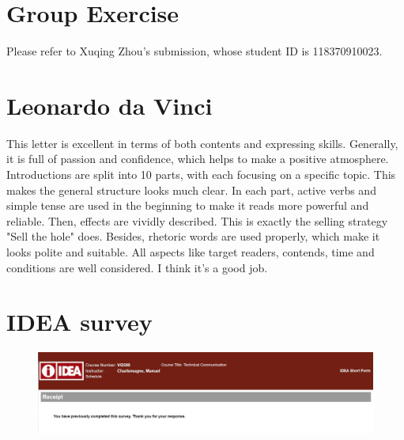 \documentclass[paper=a4, fontsize=11pt]{scrartcl} %
\numberwithin{equation}{section} %
\numberwithin{figure}{section} %
\numberwithin{table}{section} %
\begin{document}
\section{Group Exercise}
	Please refer to Xuqing Zhou's submission, whose student ID is 118370910023.

\section{Leonardo da Vinci}
	This letter is excellent in terms of both contents and expressing skills. Generally, it is full of passion and confidence, which helps to make a positive atmosphere. \newline
	Introductions are split into 10 parts, with each focusing on a specific topic. This makes the general structure looks much clear. \newline
	In each part, active verbs and simple tense are used in the beginning to make it reads more powerful and reliable. Then, effects are vividly described. This is exactly the selling strategy "Sell the hole" does.\newline
	Besides, rhetoric words are used properly, which make it looks polite and suitable. All aspects like target readers, contends, time and conditions are well considered. I think it's a good job.
	
\section{IDEA survey}
	\begin{figure}[h]
		\centering
		\includegraphics[width=\linewidth]{IDEA.jpg}
	\end{figure}
	
\end{document}
